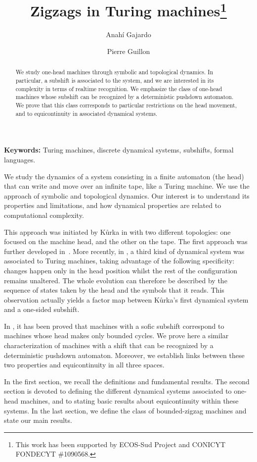\documentclass{llncs}
\title{Zigzags in Turing machines\thanks{This work has been supported by ECOS-Sud Project and CONICYT FONDECYT \#1090568.}}
\author{Anah\'i Gajardo\inst1 \and Pierre Guillon\inst2}
\institute{Departamento de Ingenier\'ia Matem\'atica, Universidad de Concepci\'on,
Casilla 160-C, Concepci\'on, Chile
\email{anahi@ing-mat.udec.cl}
\and
DIM - CMM, UMI CNRS 2807, Universidad de Chile, Av. Blanco Encalada 2120,
Santiago, Chile
\email{pguillon@dim.uchile.cl}
}
\begin{document}
\maketitle

\begin{abstract}
We study one-head machines through symbolic and topological dynamics.
In particular, a subshift is associated to the system, and we are interested in its complexity in terms of realtime recognition.
We emphasize the class of one-head machines whose subshift can be recognized by a deterministic pushdown automaton.
We prove that this class corresponds to particular restrictions on the head movement, and to equicontinuity in associated dynamical systems.
\end{abstract}

\noindent\textbf{Keywords:} Turing machines, discrete dynamical systems, subshifts, formal languages.

We study the dynamics of a system consisting in a finite automaton (the head) that can write and move over an infinite tape, like a Turing machine.
We use the approach of symbolic and topological dynamics.
Our interest is to understand its properties and limitations, and how dynamical properties are related to computational complexity.

This approach was initiated by K\r urka in \cite{Kurk} with two different topologies: one focused on the machine head, and the other on the tape.
The first approach was further developed in~\cite{Nich,Opro}.
More recently, in \cite{Gaja07,GajaJAC}, a third kind of dynamical system was associated to Turing machines, taking advantage of the following specificity: changes happen only in the head position whilst the rest of the configuration remains unaltered.
The whole evolution can therefore be described by the sequence of states taken by the head and the symbols that it reads.
This observation actually yields a factor map between K\r urka's first dynamical system and a one-sided subshift.

In \cite{Gaja07}, it has been proved that machines with a sofic subshift correspond to machines whose head makes only bounded cycles.
We prove here a similar characterization of machines with a shift that can be recognized by a deterministic pushdown automaton.
Moreover, we establish links between these two properties and equicontinuity in all three spaces.


In the first section, we recall the definitions and fundamental results.
The second section is devoted to defining the different dynamical systems associated to one-head machines, and to stating basic results about equicontinuity within these systems.
In the last section, we define the class of bounded-zigzag machines and state our main results.
\end{document}
